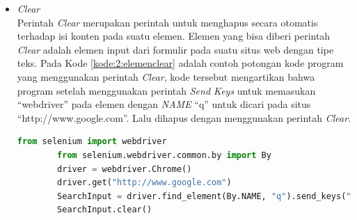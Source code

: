 \begin{itemize}
	\item \textit{Clear}\\
	Perintah \textit{Clear} merupakan perintah untuk menghapus secara otomatis terhadap isi konten pada suatu elemen. Elemen yang bisa diberi perintah \textit{Clear} adalah elemen input dari formulir pada suatu situs web dengan tipe teks. Pada Kode \ref{kode:2:elemenclear} adalah contoh potongan kode program yang menggunakan perintah \textit{Clear}, kode tersebut mengartikan bahwa program setelah menggunakan perintah \textit{Send Keys} untuk memasukan ``webdriver'' pada elemen dengan \textit{NAME} ``q'' untuk dicari pada situs ``http://www.google.com''. Lalu dihapus dengan menggunakan perintah \textit{Clear}.
	\begin{lstlisting}[language=python, caption=Contoh Potongan Kode Perintah \textit{Clear} pada Suatu Elemen, label=kode:2:elemenclear]
		from selenium import webdriver
		from selenium.webdriver.common.by import By
		driver = webdriver.Chrome()
		driver.get("http://www.google.com")
		SearchInput = driver.find_element(By.NAME, "q").send_keys("webdriver")
		SearchInput.clear()
	\end{lstlisting}
	
\end{itemize}

